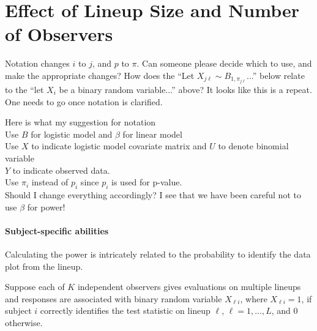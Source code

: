 \documentclass{article}
\newcommand{\red}[1]{{\color{red} #1}}
\newcommand{\green}[1]{{\color{green} #1}} %
\begin{document}
\section{Effect of Lineup Size and Number of Observers}

\green{Notation changes $i$ to $j$, and $p$ to $\pi$. Can someone please decide which to use, and make the appropriate changes? How does the ``Let $X_{j\ell} \sim B_{1, \pi_{j\ell}}$...'' below relate to the ``let $X_i$ be a binary random variable...'' above? It looks like this is a repeat. One needs to go once notation is clarified.}

\red{Here is what my suggestion for notation \\  Use $B$ for logistic model and $\beta$ for linear model \\ Use $X$ to indicate logistic model covariate matrix and $U$ to denote binomial variable \\ $Y$ to indicate observed data. \\ Use $\pi_i$ instead of $p_i$ since $p_i$ is used for p-value.  \\ Should I change everything accordingly? I see that we have been careful not to use $\beta$ for power! }

\paragraph{Subject-specific abilities}
Calculating the power  is intricately related to the probability to identify the data plot from the lineup. 

Suppose each of $K$ independent observers gives evaluations on multiple lineups and responses are associated with binary random variable $X_{\ell i}$, where  $X_{\ell i} = 1$, if subject $i$ correctly identifies the test statistic on lineup $\ell$,  $\ell = 1, ..., L$, and 0 otherwise.
\end{document}
